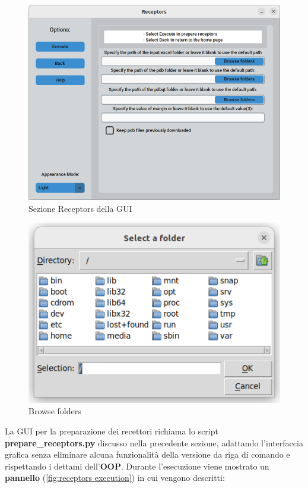 \begin{figure}[H]
    \centering
    \includegraphics[scale=0.6]{immagini/capitolo3/receptors.png}
    \caption{Sezione Receptors della GUI}
    \label{fig:receptors}
\end{figure}

\begin{figure}[H]
    \centering
    \includegraphics{immagini/capitolo3/browseFoldersReceptors.png}
    \caption{Browse folders}
    \label{fig:browse folders receptors}
\end{figure}

La GUI per la preparazione dei recettori richiama lo script \textbf{prepare\_receptors.py} discusso nella precedente sezione, adattando l'interfaccia grafica senza eliminare alcuna funzionalità della versione da riga di comando e rispettando i dettami dell'\textbf{OOP}.\newline
Durante l'esecuzione viene mostrato un \textbf{pannello} (\ref{fig:receptors execution}) in cui vengono descritti:

